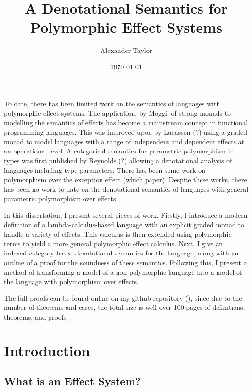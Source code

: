 \documentclass{Report}
\title{A Denotational Semantics for Polymorphic Effect Systems}
\date{\today}
\author{Alexander Taylor}
\begin{document}
\maketitle



\abstract
To date, there has been limited work on the semantics of languages with polymorphic effect systems. The application, by Moggi, of strong monads to modelling the semantics of effects has become a mainstream concept in functional programming languages. This was improved upon by Lucasson (?) using a graded monad to model languages with a range of independent and dependent effects at an operational level. A categorical semantics for parametric polymorphism in types was first published by Reynolds (?) allowing a denotational analysis of languages including type parameters. There has been some work on polymorphism over the exception effect (which paper). Despite these works, there has been no work to date on the denotational semantics of languages with general parametric polymorphism over effects.

In this dissertation, I present several pieces of work. Firstly, I introduce a modern definition of a lambda-calculus-based language with an explicit graded monad to handle a variety of effects. This calculus is then extended using polymorphic terms to yield a more general polymorphic effect calculus. Next, I give an indexed-category-based denotational semantics for the language, along with an outline of a proof for the soundness of these semantics. Following this, I present a method of transforming a model of a non-polymorphic language into a model of the language with polymorphism over effects.

The full proofs can be found online on my github repository (), since due to the number of theorems and cases, the total size is well over 100 pages of definitions, theorems, and proofs.

\tableofcontents

\chapter{Introduction}


\section{What is an Effect System?}
\end{document}
